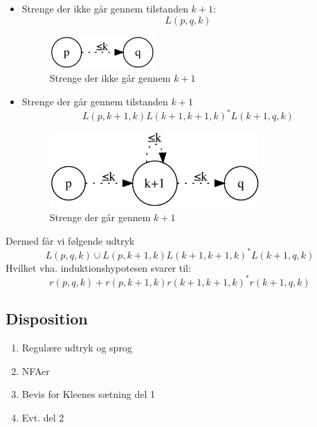 \documentclass[a4, danish]{article}
\begin{document}
  \begin{itemize}
	  \item Strenge der ikke går gennem tilstanden $k+1$:
    \begin{equation*}
      L(p,q,k)
    \end{equation*}
    \begin{figure}[h]
  	  \centering
  	  \includegraphics[width=40mm]{img/kleene21}
  	  \caption{Strenge der ikke går gennem $k+1$	\label{Kleene21}}
    \end{figure}
    \item Strenge der går gennem tilstanden $k+1$
    \begin{equation*}
        L(p,k+1,k)L(k+1,k+1, k)^*L(k+1,q,k)
    \end{equation*}
        \begin{figure}[h]
  	  \centering
  	  \includegraphics[width=80mm]{img/kleene22}
  	  \caption{Strenge der går gennem $k+1$	\label{Kleene22}}
    \end{figure}
  \end{itemize}
  Dermed får vi følgende udtryk
  \begin{equation*}
      L(p,q,k) \cup L(p,k+1,k)L(k+1,k+1, k)^*L(k+1,q,k)
  \end{equation*}
  Hvilket vha. induktionshypotesen svarer til:
  \begin{equation*}
      r(p,q,k) + r(p,k+1,k)r(k+1,k+1, k)^*r(k+1,q,k)
  \end{equation*}
    
  
\newpage
\subsection{Disposition}
\begin{enumerate}
  \item Regulære udtryk og sprog
  \item NFAer
  \item Bevis for Kleenes sætning del 1
  \item Evt. del 2 
\end{enumerate}
\end{document}
